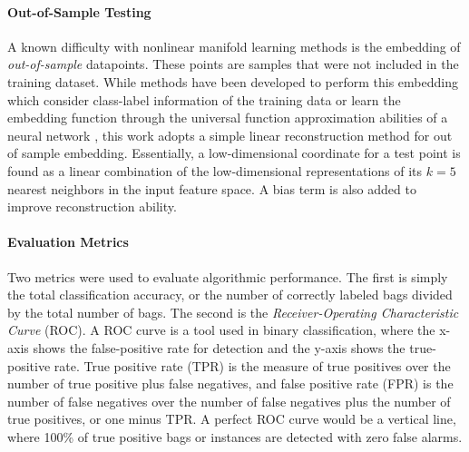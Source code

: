 \paragraph{Out-of-Sample Testing}
A known difficulty with nonlinear manifold learning methods is the embedding of \textit{out-of-sample} datapoints.  These points are samples that were not included in the training  dataset.  While methods have been developed to perform this embedding which consider class-label information of the training data or learn the embedding function through the universal function approximation abilities of a neural network \cite{Vural2016OutOfSampleSupManifoldLearning,Mendoza2016ELMOutOfSample}, this work adopts a simple linear reconstruction method for out of sample embedding.  Essentially, a low-dimensional coordinate for a test point is found as a linear combination of the low-dimensional representations of its $k=5$ nearest neighbors in the input feature space.  A bias term is also added to improve reconstruction ability.  


\paragraph{Evaluation Metrics}
Two metrics were used to evaluate algorithmic performance.  The first is simply the total classification accuracy, or the number of correctly labeled bags divided by the total number of bags.  The second is the \textit{Receiver-Operating Characteristic Curve} (ROC).  A ROC curve is a tool used in binary classification, where the x-axis shows the false-positive rate for detection and the y-axis shows the true-positive rate.  True positive rate (TPR) is the measure of true positives over the number of true positive plus false negatives, and false positive rate (FPR) is the number  of false negatives over the number of false negatives plus the number of true positives, or one minus TPR.  A perfect ROC curve would be a vertical line, where 100\% of true positive bags or instances are detected with zero false alarms.


